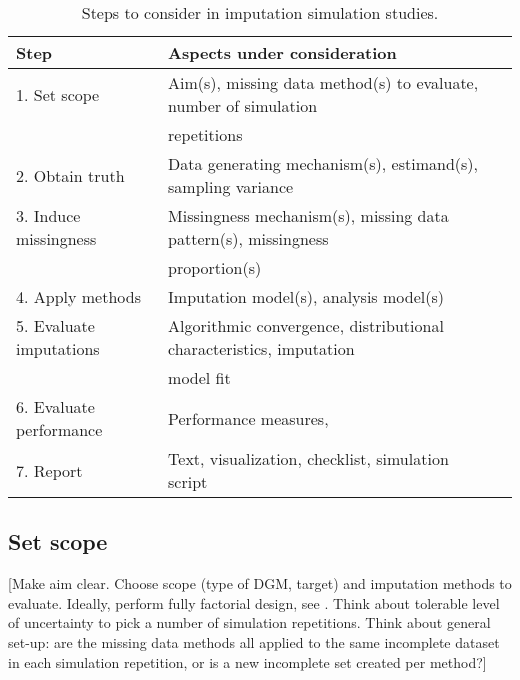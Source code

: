 \documentclass[bimj,fleqn]{w-art}
\theoremstyle{plain}
\theoremstyle{definition}
\begin{document}
\begin{table}[htb]
\begin{center}
\caption{Steps to consider in imputation simulation studies.}
\begin{tabular}{lll}
\hline
Step                    & Aspects under consideration \\
\hline  
1. Set scope            & Aim(s), missing data method(s) to evaluate, number of simulation \\
                        & repetitions \\
2. Obtain truth         & Data generating mechanism(s), estimand(s), sampling variance \\
3. Induce missingness   & Missingness mechanism(s), missing data pattern(s), missingness \\
                        & proportion(s) \\
4. Apply methods        & Imputation model(s), analysis model(s) \\
5. Evaluate imputations & Algorithmic convergence, distributional characteristics, imputation \\
                        & model fit \\
6. Evaluate performance & Performance measures,  \\
7. Report               & Text, visualization, checklist, simulation script \\
\hline
\end{tabular}
\end{center}
\end{table}



\subsection{Set scope}

[Make aim clear. Choose scope (type of DGM, target) and imputation methods to evaluate. Ideally, perform fully factorial design, see \citet{morr18}. Think about tolerable level of uncertainty to pick a number of simulation repetitions. Think about general set-up: are the missing data methods all applied to the same incomplete dataset in each simulation repetition, or is a new incomplete set created per method?] 


\end{document}

